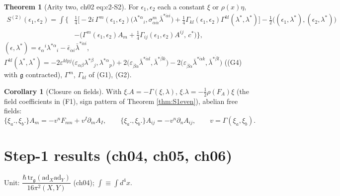 \documentclass[11pt]{article}
\theoremstyle{definition}
\newtheorem{theorem}[definition]{Theorem}
\newtheorem{corollary}[definition]{Corollary}
\begin{document}
\begin{theorem}[Arity two, ch02 eq:c2-S2]\label{thm:S2}
For $\epsilon_1,\epsilon_2$ each a constant $\xi$ or $\rho(x)\eta$,
\begin{equation}\tag{F3}
\begin{aligned}
S^{(2)}(\epsilon_1,\epsilon_2)=\int\Big\{&\tfrac14\Big[-2i\,\Gamma^m(\epsilon_1,\epsilon_2)\big(\lambda^{*\alpha}{}_i,\sigma^m_{\alpha\dot\alpha}\bar\lambda^{*\dot\alpha i}\big)+\tfrac14\Gamma_{kl}(\epsilon_1,\epsilon_2)\Gamma^{kl}(\lambda^*,\lambda^*)\Big]-\tfrac12\big((\epsilon_1,\lambda^*),(\epsilon_2,\lambda^*)\big)\\
&-\big(\Gamma^m(\epsilon_1,\epsilon_2)A_m+\tfrac14\Gamma_{ij}(\epsilon_1,\epsilon_2)A^{ij},\,c^*\big)\Big\},
\end{aligned}
\end{equation}
$(\epsilon,\lambda^*)=\epsilon_\alpha{}^i\lambda^{*\alpha}{}_i-\bar\epsilon_{\dot\alpha i}\bar\lambda^{*\dot\alpha i}$, $\Gamma^{kl}(\lambda^*,\lambda^*)=-2\varepsilon^{klpj}\big(\varepsilon_{\alpha\beta}\lambda^{*\beta}{}_j,\lambda^{*\alpha}{}_p\big)+2\big(\varepsilon_{\dot\beta\dot\alpha}\bar\lambda^{*\dot\alpha l},\bar\lambda^{*\dot\beta k}\big)-2\big(\varepsilon_{\dot\beta\dot\alpha}\bar\lambda^{*\dot\alpha k},\bar\lambda^{*\dot\beta l}\big)$ ((G4) with $\mathfrak g$ contracted), $\Gamma^m$, $\Gamma_{kl}$ of (G1), (G2).
\end{theorem}

\begin{corollary}[Closure on fields]\label{cor:closure}
With $\xi.A=-\Gamma(\xi,\lambda)$, $\xi.\lambda=-\tfrac12\rho(F_A)\xi$ (the field coefficients in (F1), sign pattern of Theorem \ref{thm:S1even}), abelian free fields:
\[
\{\xi_a.,\xi_b.\}A_m=-v^nF_{nm}+v^I\partial_mA_I,\qquad \{\xi_a.,\xi_b.\}A_{ij}=-v^n\partial_nA_{ij},\qquad v=\Gamma(\xi_a,\xi_b).
\]
\end{corollary}

\section{Step-1 results (ch04, ch05, ch06)}

Unit: $\dfrac{\hbar\,\mathrm{tr}_{\mathfrak g}(\mathrm{ad}_X\mathrm{ad}_Y)}{16\pi^2(X,Y)}$ (ch04); $\int\equiv\int d^4x$.
\end{document}
